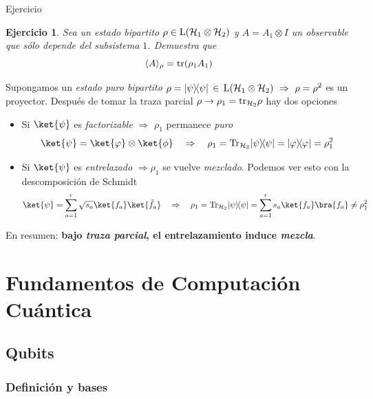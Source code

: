 \documentclass[a4paper,11pt]{book} %
\newtheorem{ejercicio_contador}{Ejercicio}
\newcommand{\Ejercicio}[1]{
		\begin{mybox_gray}{Ejercicio} 
			\begin{ejercicio_contador}
				 #1 
			\end{ejercicio_contador} 
		\end{mybox_gray}
	}
\numberwithin{equation}{chapter}
\newcommand{\ketbra}[2]{| #1\rangle \! \langle #2|}
\begin{document}
	\Ejercicio{
	Sea un estado bipartito $\rho \in {\rm L}(\mathcal{H}_1\otimes\mathcal{H}_2)$ y $A=A_1\otimes I$ un observable que sólo depende del subsistema $1$. Demuestra que 
		\begin{equation}
		\langle A \rangle_\rho  = {\rm tr} (\rho_1 A_1)
		\end{equation}
	}

Supongamos un \textit{estado puro bipartito}  $\rho=\ketbra{\psi}{\psi}\, \in \,  {\rm L}(\mathcal{H}_1\otimes\mathcal{H}_2)~\Rightarrow ~ \rho=\rho^2$ es un proyector. Después de tomar la traza parcial  $\rho\to \rho_1 = {\rm tr}_{\mathcal{H}_2}\rho$ hay dos opciones
	\begin{itemize}
		\item Si $\ket{\psi}$ es \textit{factorizable} $\Rightarrow $ $\rho_1$ permanece \textit{puro}
			\begin{equation}
			\ket{\psi} = \ket{\varphi}\otimes \ket{\phi} ~~~ \Rightarrow ~~~ \rho_1 = {\rm Tr}_{\mathcal{H}_2}\ketbra{\psi}{\psi} = \ketbra{\varphi}{\varphi} = \rho_1^2
			\end{equation}

		\item Si $\ket{\psi}$ es \textit{entrelazado} $\Rightarrow \rho_1$ se vuelve \textit{mezclado}. Podemos ver esto con la descomposición de Schmidt
	\begin{equation}
	\ket{\psi} = \sum_{a=1}^r \sqrt{s_a}\ket{f_a}\ket{\tilde f_a} ~~~\Rightarrow ~~~ \rho_1 = {\rm Tr}_{\mathcal{H}_2}\ketbra{\psi}{\psi} = \sum_{a=1}^r s_a \ket{f_a}\bra{f_a} \neq \rho_1^2
	\end{equation}

	\end{itemize}			

En resumen: \textbf{bajo \textit{traza parcial}, el entrelazamiento induce \textit{mezcla}}.

		
		
	
\part{Fundamentos de Computación Cuántica} \label{part_fundamentos_cc}

\chapter{Qubits}

    \section{Definición y bases}
    
\end{document}
